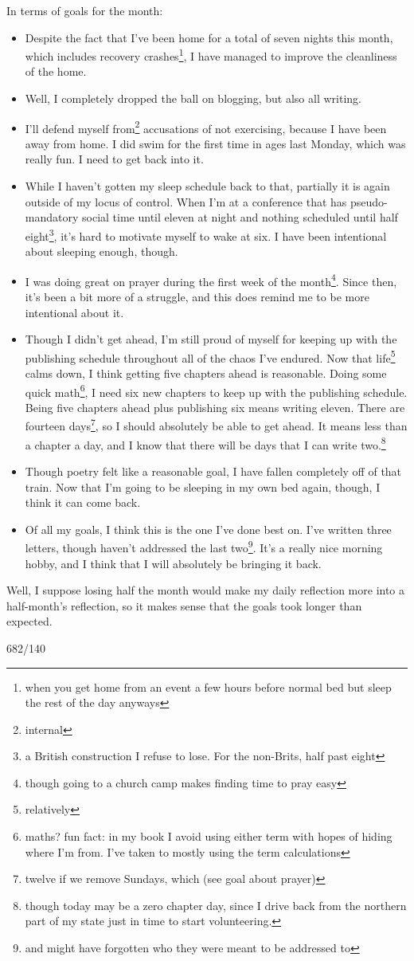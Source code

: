 \documentclass[12pt]{article}[titlepage]
\newcommand{\1}{\={a}}
\newcommand{\2}{\={e}}
\newcommand{\3}{\={\i}}
\newcommand{\4}{\=o}
\newcommand{\5}{\=u}
\newcommand{\6}{\={A}}
\renewcommand{\,}{\textsuperscript{,}}
\begin{document}
In terms of goals for the month:
\begin{itemize}
\item Despite the fact that I've been home for a total of seven nights this month, which includes recovery crashes\footnote{when you get home from an event a few hours before normal bed but sleep the rest of the day anyways}, I have managed to improve the cleanliness of the home.
\item Well, I completely dropped the ball on blogging, but also all writing.
\item I'll defend myself from\footnote{internal} accusations of not exercising, because I have been away from home. I did swim for the first time in ages last Monday, which was really fun.
I need to get back into it.
\item While I haven't gotten my sleep schedule back to that, partially it is again outside of my locus of control.
When I'm at a conference that has pseudo-mandatory social time until eleven at night and nothing scheduled until half eight\footnote{a British construction I refuse to lose. For the non-Brits, half past eight}, it's hard to motivate myself to wake at six. I have been intentional about sleeping enough, though.
\item I was doing great on prayer during the first week of the month\footnote{though going to a church camp makes finding time to pray easy}. Since then, it's been a bit more of a struggle, and this does remind me to be more intentional about it.
\item Though I didn't get ahead, I'm still proud of myself for keeping up with the publishing schedule throughout all of the chaos I've endured.
Now that life\footnote{relatively} calms down, I think getting five chapters ahead is reasonable. Doing some quick math\footnote{maths? fun fact: in my book I avoid using either term with hopes of hiding where I'm from. I've taken to mostly using the term calculations}, I need six new chapters to keep up with the publishing schedule.
Being five chapters ahead plus publishing six means writing eleven.
There are fourteen days\footnote{twelve if we remove Sundays, which (see goal about prayer)}, so I should absolutely be able to get ahead.
It means less than a chapter a day, and I know that there will be days that I can write two.\footnote{though today may be a zero chapter day, since I drive back from the northern part of my state just in time to start volunteering.}
\item Though poetry felt like a reasonable goal, I have fallen completely off of that train.
Now that I'm going to be sleeping in my own bed again, though, I think it can come back.
\item Of all my goals, I think this is the one I've done best on. 
I've written three letters, though haven't addressed the last two\footnote{and might have forgotten who they were meant to be addressed to}. It's a really nice morning hobby, and I think that I will absolutely be bringing it back.
\end{itemize}

Well, I suppose losing half the month would make my daily reflection more into a half-month's reflection, so it makes sense that the goals took longer than expected.

682/140
\end{document}
